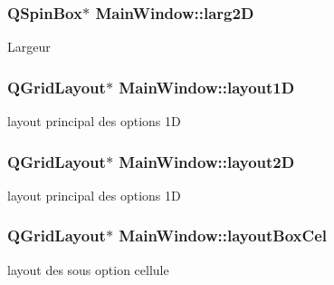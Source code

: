 \subsubsection[{\texorpdfstring{larg2D}{larg2D}}]{\setlength{\rightskip}{0pt plus 5cm}Q\+Spin\+Box$\ast$ Main\+Window\+::larg2D\hspace{0.3cm}{\ttfamily [private]}}\hypertarget{class_main_window_af66e8d082f97a24629399dec9da7aa03}{}\label{class_main_window_af66e8d082f97a24629399dec9da7aa03}
Largeur 
\subsubsection[{\texorpdfstring{layout1D}{layout1D}}]{\setlength{\rightskip}{0pt plus 5cm}Q\+Grid\+Layout$\ast$ Main\+Window\+::layout1D\hspace{0.3cm}{\ttfamily [private]}}\hypertarget{class_main_window_a25605b8d3fa4ec4b5cef93bb266136e7}{}\label{class_main_window_a25605b8d3fa4ec4b5cef93bb266136e7}
layout principal des options 1D 
\subsubsection[{\texorpdfstring{layout2D}{layout2D}}]{\setlength{\rightskip}{0pt plus 5cm}Q\+Grid\+Layout$\ast$ Main\+Window\+::layout2D\hspace{0.3cm}{\ttfamily [private]}}\hypertarget{class_main_window_a648672720c15d3b363c131c91408422d}{}\label{class_main_window_a648672720c15d3b363c131c91408422d}
layout principal des options 1D 
\subsubsection[{\texorpdfstring{layout\+Box\+Cel}{layoutBoxCel}}]{\setlength{\rightskip}{0pt plus 5cm}Q\+Grid\+Layout$\ast$ Main\+Window\+::layout\+Box\+Cel\hspace{0.3cm}{\ttfamily [private]}}\hypertarget{class_main_window_accffbd02cf5f6e812592410d90a2bf01}{}\label{class_main_window_accffbd02cf5f6e812592410d90a2bf01}
layout des sous option cellule 
